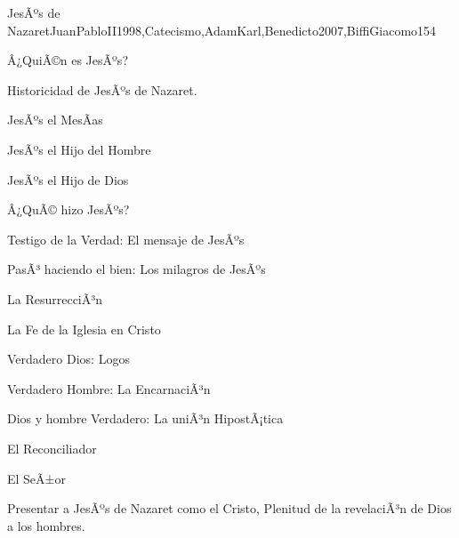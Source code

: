 \begin{syllabus}
\begin{unit}{JesÃºs de Nazaret}{JuanPabloII1998,Catecismo,AdamKarl,Benedicto2007,BiffiGiacomo}{15}{4}
\begin{topics}
      \item Â¿QuiÃ©n es JesÃºs?
      \begin{inparaenum}
      \item Historicidad de JesÃºs de Nazaret.
      \item JesÃºs el MesÃ­as
      \item JesÃºs el Hijo del Hombre
      \item JesÃºs el Hijo de Dios
\end{inparaenum}
      \item Â¿QuÃ© hizo JesÃºs?
      \begin{inparaenum}
      \item Testigo de la Verdad: El mensaje de JesÃºs
      \item PasÃ³ haciendo el bien: Los milagros de JesÃºs
      \item La ResurrecciÃ³n
\end{inparaenum}
      \item La Fe de la Iglesia en Cristo
      \begin{inparaenum}
      \item Verdadero Dios: Logos
      \item Verdadero Hombre: La EncarnaciÃ³n
      \item Dios y hombre Verdadero: La uniÃ³n HipostÃ¡tica
      \item El Reconciliador
      \item El SeÃ±or
	\end{inparaenum}

\end{topics}

\begin{unitgoals}
      \item Presentar a JesÃºs de Nazaret como el Cristo, Plenitud de la revelaciÃ³n de Dios a los hombres.
\end{unitgoals}
\end{unit}


\end{syllabus}

